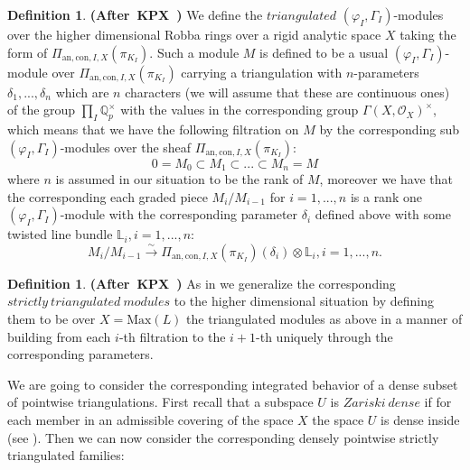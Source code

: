 \documentclass[12pt]{amsart}
\theoremstyle{definition}
\newtheorem{definition}[theorem]{Definition}
\numberwithin{equation}{section}
\begin{document}
\begin{definition} \mbox{\bf{(After KPX \cite[Definition 6.3.1]{KPX})}}
We define the $triangulated$ $(\varphi_I,\Gamma_I)$-modules over the higher dimensional Robba rings over a rigid analytic space $X$ taking the form of $\Pi_{\mathrm{an},\mathrm{con},I,X}(\pi_{K_I})$. Such a module $M$ is defined to be a usual $(\varphi_I,\Gamma_I)$-module over $\Pi_{\mathrm{an},\mathrm{con},I,X}(\pi_{K_I})$ carrying a triangulation with $n$-parameters $\delta_1,...,\delta_n$ which are $n$ characters (we will assume that these are continuous ones) of the group $\prod_{I}\mathbb{Q}_p^\times$ with the values in the corresponding group $\Gamma(X,\mathcal{O}_X)^\times$, which means that we have the following filtration on $M$ by the corresponding sub $(\varphi_I,\Gamma_I)$-modules over the sheaf $\Pi_{\mathrm{an},\mathrm{con},I,X}(\pi_{K_I})$:
\begin{displaymath}
0=M_0\subset M_1\subset...\subset M_n=M	
\end{displaymath}
where $n$ is assumed in our situation to be the rank of $M$, moreover we have that the corresponding each graded piece $M_{i}/M_{i-1}$ for $i=1,...,n$ is a rank one $(\varphi_I,\Gamma_I)$-module with the corresponding parameter $\delta_i$ defined above with some twisted line bundle $\mathbb{L}_i,i=1,...,n$:
\begin{displaymath}
M_{i}/M_{i-1}\overset{\sim}{\longrightarrow}\Pi_{\mathrm{an},\mathrm{con},I,X}(\pi_{K_I})(\delta_i)\otimes \mathbb{L}_i,i=1,...,n.	
\end{displaymath}
\end{definition}




\begin{definition} \mbox{\bf{(After KPX \cite[Definition 6.3.1]{KPX})}}
As in \cite[Definition 6.3.1]{KPX} we generalize the corresponding $strictly~triangulated~modules$ to the higher dimensional situation by defining them to be over $X=\mathrm{Max}(L)$ the triangulated modules as above in a manner of building from each $i$-th filtration to the $i+1$-th uniquely through the corresponding parameters.
\end{definition}





\indent We are going to consider the corresponding integrated behavior of a dense subset of pointwise triangulations. First recall that a subspace $U$ is $Zariski~dense$ if for each member in an admissible covering of the space $X$ the space $U$ is dense inside (see \cite[Chapter 6.3]{KPX}). Then we can now consider the corresponding densely pointwise strictly triangulated families:
\end{document}
